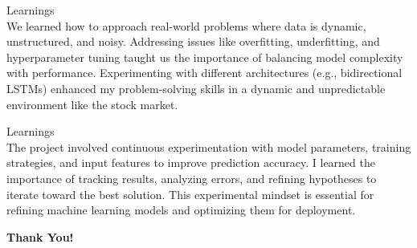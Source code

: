 \documentclass[9pt]{beamer}
\begin{document}
\begin{frame}{Learnings}
    \\[0.3cm]
    We learned how to approach real-world problems where data is dynamic, unstructured, and noisy. Addressing issues like overfitting, underfitting, and hyperparameter tuning taught us the importance of balancing model complexity with performance. Experimenting with different architectures (e.g., bidirectional LSTMs) enhanced my problem-solving skills in a dynamic and unpredictable environment like the stock market.
\end{frame}

\begin{frame}{Learnings}
    \\[0.3cm]
    The project involved continuous experimentation with model parameters, training strategies, and input features to improve prediction accuracy. I learned the importance of tracking results, analyzing errors, and refining hypotheses to iterate toward the best solution. This experimental mindset is essential for refining machine learning models and optimizing them for deployment.
\end{frame}

\begin{frame}[c]
    \centering
    {\Huge \textbf{Thank You!}}\\[1cm]
\end{frame}
\end{document}
